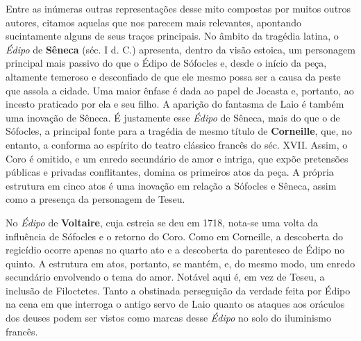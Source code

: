 Entre as inúmeras outras representações desse mito compostas por muitos
outros autores, citamos aquelas que nos parecem mais relevantes,
apontando sucintamente alguns de seus traços principais. No âmbito da
tragédia latina, o \emph{Édipo} de \textbf{Sêneca} (séc. I d. C.)
apresenta, dentro da visão estoica, um personagem principal mais passivo
do que o Édipo de Sófocles e, desde o início da peça, altamente temeroso
e desconfiado de que ele mesmo possa ser a causa da peste que assola a
cidade. Uma maior ênfase é dada ao papel de Jocasta e, portanto, ao
incesto praticado por ela e seu filho. A aparição do fantasma de Laio é
também uma inovação de Sêneca. É justamente esse \emph{Édipo} de Sêneca,
mais do que o de Sófocles, a principal fonte para a tragédia de mesmo
título de \textbf{Corneille}, que, no entanto, a conforma ao espírito do
teatro clássico francês do séc. XVII. Assim, o Coro é omitido, e um
enredo secundário de amor e intriga, que expõe pretensões públicas e
privadas conflitantes, domina os primeiros atos da peça. A própria
estrutura em cinco atos é uma inovação em relação a Sófocles e Sêneca,
assim como a presença da personagem de Teseu.

No \emph{Édipo} de \textbf{Voltaire}, cuja estreia se deu em 1718,
nota-se uma volta da influência de Sófocles e o retorno do Coro. Como em
Corneille, a descoberta do regicídio ocorre apenas no quarto ato e a
descoberta do parentesco de Édipo no quinto. A estrutura em atos,
portanto, se mantém, e, do mesmo modo, um enredo secundário envolvendo o
tema do amor. Notável aqui é, em vez de Teseu, a inclusão de Filoctetes.
Tanto a obstinada perseguição da verdade feita por Édipo na cena em que
interroga o antigo servo de Laio quanto os ataques aos oráculos dos
deuses podem ser vistos como marcas desse \emph{Édipo} no solo do
iluminismo francês.

